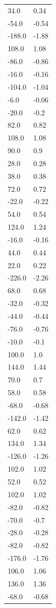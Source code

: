 \begin{longtable}{ll}
34.0 & 0.34 \\
-54.0 & -0.54 \\
-188.0 & -1.88 \\
108.0 & 1.08 \\
-86.0 & -0.86 \\
-16.0 & -0.16 \\
-104.0 & -1.04 \\
-6.0 & -0.06 \\
-20.0 & -0.2 \\
82.0 & 0.82 \\
108.0 & 1.08 \\
90.0 & 0.9 \\
28.0 & 0.28 \\
38.0 & 0.38 \\
72.0 & 0.72 \\
-22.0 & -0.22 \\
54.0 & 0.54 \\
124.0 & 1.24 \\
-16.0 & -0.16 \\
44.0 & 0.44 \\
22.0 & 0.22 \\
-226.0 & -2.26 \\
68.0 & 0.68 \\
-32.0 & -0.32 \\
-44.0 & -0.44 \\
-76.0 & -0.76 \\
-10.0 & -0.1 \\
100.0 & 1.0 \\
144.0 & 1.44 \\
70.0 & 0.7 \\
58.0 & 0.58 \\
-68.0 & -0.68 \\
-142.0 & -1.42 \\
62.0 & 0.62 \\
134.0 & 1.34 \\
-126.0 & -1.26 \\
102.0 & 1.02 \\
52.0 & 0.52 \\
102.0 & 1.02 \\
-82.0 & -0.82 \\
-70.0 & -0.7 \\
-28.0 & -0.28 \\
-82.0 & -0.82 \\
-176.0 & -1.76 \\
106.0 & 1.06 \\
136.0 & 1.36 \\
-68.0 & -0.68 \\

\end{longtable}
